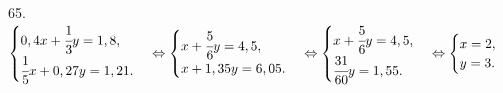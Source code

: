 65. $\begin{cases}
0,4x+\cfrac{1}{3}y=1,8,\\
\cfrac{1}{5}x+0,27y=1,21.
\end{cases}\Leftrightarrow\begin{cases}
x+\cfrac{5}{6}y=4,5,\\
x+1,35y=6,05.
\end{cases}\Leftrightarrow\begin{cases}
x+\cfrac{5}{6}y=4,5,\\
\cfrac{31}{60}y=1,55.
\end{cases}
\Leftrightarrow\begin{cases}
x=2,\\
y=3.
\end{cases}$\\
